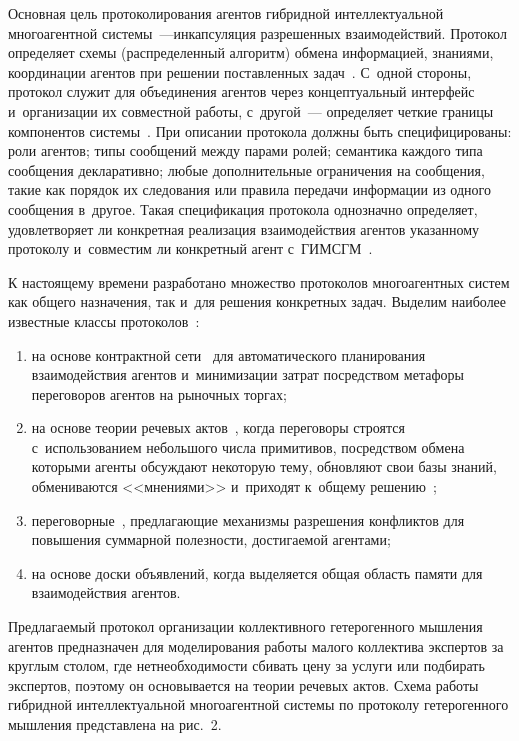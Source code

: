 \begin{multicols}{2}
  Основная цель протоколирования агентов гиб\-рид\-ной интеллектуальной 
многоагентной системы~---инкапсуляция разрешенных взаимодействий. Протокол 
определяет схемы (распределенный алгоритм) обмена информацией, знаниями, 
координации агентов при решении по\-став\-лен\-ных задач~\cite{13-kol}. С~одной стороны, 
протокол служит для объединения агентов через концептуальный интерфейс 
и~организации их совместной работы, с~другой~--- определяет четкие границы 
компонентов сис\-те\-мы~\cite{14-kol}. При описании протокола должны быть 
специфицированы: роли агентов; типы сообщений между парами ролей; 
семантика каждого типа сообщения декларативно; любые дополнительные 
ограничения на сообщения, такие как порядок их следования или правила 
передачи информации из одного сообщения в~другое. Такая спецификация 
протокола однозначно определяет, удовлетворяет ли конкретная реализация 
взаимодействия агентов указанному протоколу и~совместим ли конкретный 
агент с~\mbox{ГИМСГМ}~\cite{14-kol}.



  
  К настоящему времени разработано множество протоколов многоагентных 
сис\-тем как общего назначения, так и~для решения конкретных задач. Выделим 
наиболее известные классы протоколов~\cite{13-kol, 15-kol}: 
\begin{enumerate}[(1)]
\item на основе контрактной 
сети~\cite{16-kol, 17-kol} для автоматического планирования взаимодействия агентов 
и~минимизации за\-трат посредством метафоры переговоров агентов на 
рыночных торгах; 
\item на основе теории речевых актов~\cite{18-kol}, когда переговоры 
строятся с~использованием небольшого чис\-ла примитивов, по\-сред\-ст\-вом обмена 
которыми агенты об\-суж\-да\-ют некоторую тему, обновляют свои базы знаний, 
обмениваются <<мнениями>> и~приходят к~общему решению~\cite{13-kol}; 
\item переговорные~\cite{19-kol, 20-kol}, пред\-ла\-га\-ющие механизмы разрешения конфликтов 
для повышения суммарной по\-лез\-ности, до\-сти\-га\-емой аген\-тами; 
\item на основе 
доски объявлений, когда выделяется общая область памяти для взаимодействия 
агентов.
\end{enumerate} 
  
  Предлагаемый протокол организации коллективного гетерогенного 
мышления агентов пред\-назначен для моделирования работы малого кол\-лектива 
экспертов за круглым столом, где нет\linebreak необходимости сбивать цену за услуги 
или подбирать экспертов, поэтому он основывается на теории речевых актов. 
Схема работы гибридной интеллектуальной многоагентной сис\-те\-мы по 
протоколу гетерогенного мыш\-ле\-ния представлена на рис.~2.
  




\end{multicols}
